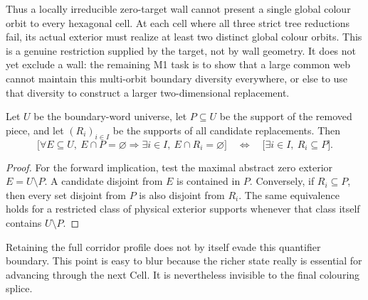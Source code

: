 Thus a locally irreducible zero-target wall cannot present a single global
colour orbit to every hexagonal cell.  At each cell where all three strict
tree reductions fail, its actual exterior must realize at least two distinct
global colour orbits.  This is a genuine restriction supplied by the target,
not by wall geometry.  It does not yet exclude a wall: the remaining M1 task
is to show that a large common web cannot maintain this multi-orbit boundary
diversity everywhere, or else to use that diversity to construct a larger
two-dimensional replacement.

\begin{theorem}
\label{thm:target-aware-quantifier-collapse}
Let \(U\) be the boundary-word universe, let \(P\subseteq U\) be the support
of the removed piece, and let \((R_i)_{i\in I}\) be the supports of all
candidate replacements.  Then
\[
 \bigl[
   \forall E\subseteq U,\ E\cap P=\varnothing
   \Longrightarrow
   \exists i\in I,\ E\cap R_i=\varnothing
 \bigr]
 \quad\Longleftrightarrow\quad
 \bigl[\exists i\in I,\ R_i\subseteq P\bigr].
\]
\end{theorem}

\begin{proof}
For the forward implication, test the maximal abstract zero exterior
\(E=U\setminus P\).  A candidate disjoint from \(E\) is contained in \(P\).
Conversely, if \(R_i\subseteq P\), then every set disjoint from \(P\) is
also disjoint from \(R_i\).  The same equivalence holds for a restricted
class of physical exterior supports whenever that class itself contains
\(U\setminus P\).
\end{proof}

Retaining the full corridor profile does not by itself evade this quantifier
boundary.  This point is easy to blur because the richer state really is
essential for advancing through the next Cell.  It is nevertheless invisible
to the final colouring splice.

